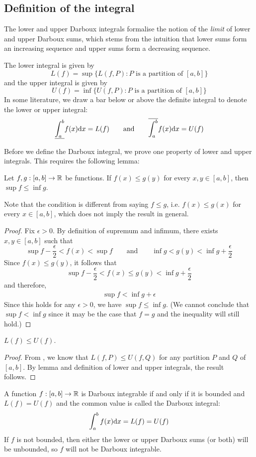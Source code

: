 \subsection{Definition of the integral}
The lower and upper Darboux integrals formalise the notion of the \textit{limit} of lower and upper Darboux sums, which stems from the intuition that lower sums form an increasing sequence and upper sums form a decreasing sequence. 
\begin{definition}
  The lower integral is given by
  \[
    L(f) = \sup\{L(f, P): P \text{ is a partition of } [a, b]\}
  \]
  and the upper integral is given by
  \[
    U(f) = \inf\{U(f, P): P \text{ is a partition of } [a, b]\}
  \]
  In some literature, we draw a bar below or above the definite integral to denote the lower or upper integral:
  \[
    \underline{\int_{a}^{b}} f(x) \! \operatorname{d\!} x = L(f) \qquad \text{and} \qquad \overline{\int_{a}^{b}} f(x) \! \operatorname{d\!} x = U(f)
  \]
\end{definition}
Before we define the Darboux integral, we prove one property of lower and upper integrals. This requires the following lemma:
\begin{lemma}
  Let $f, g: [a, b] \to \mathbb{R}$ be functions. If $f(x) \leq g(y)$ for every $x, y \in [a, b]$, then $\sup f \leq \inf g$.
\end{lemma}
Note that the condition is different from saying $f \leq g$, i.e. $f(x) \leq g(x)$ for every $x \in [a, b]$, which does not imply the result in general.
\begin{proof}
  Fix $\epsilon > 0$. By definition of supremum and infimum, there exists $x, y \in [a, b]$ such that
  \[
    \sup f - \frac{\epsilon}{2} < f(x) < \sup f \qquad \text{and} \qquad \inf g < g(y) < \inf g + \frac{\epsilon}{2}
  \]
  Since $f(x) \leq g(y)$, it follows that
  \[
    \sup f - \frac{\epsilon}{2} < f(x) \leq g(y) < \inf g + \frac{\epsilon}{2}
  \]
  and therefore,
  \begin{align*}
    \sup f < \inf g + \epsilon
  \end{align*}
  Since this holds for any $\epsilon > 0$, we have $\sup f \leq \inf g$. (We cannot conclude that $\sup f < \inf g$ since it may be the case that $f = g$ and the inequality will still hold.)
\end{proof}
\begin{prop}
  $L(f) \leq U(f)$.
  \label{prop:lower-upper-darboux-integral}
\end{prop}
\begin{proof}
  From , we know that $L(f, P) \leq U(f, Q)$ for any partition $P$ and $Q$ of $[a, b]$. By lemma and definition of lower and upper integrals, the result follows.
\end{proof}
\begin{definition}
  A function $f: [a, b] \to \mathbb{R}$ is Darboux integrable if and only if it is bounded and $L(f) = U(f)$ and the common value is called the Darboux integral:
  \[
    \int_a^b f(x) \! \operatorname{d\!} x = L(f) = U(f)
  \]
  If $f$ is not bounded, then either the lower or upper Darboux sums (or both) will be unbounded, so $f$ will not be Darboux integrable.
\end{definition}

